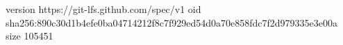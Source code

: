 version https://git-lfs.github.com/spec/v1
oid sha256:890c30d1b4efe0ba04714212f8c7f929ed54d0a70e858fdc7f2d979335e3e00a
size 105451
